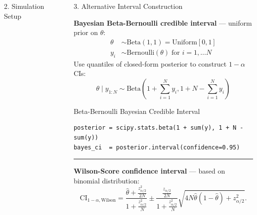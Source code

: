 \documentclass[final]{beamer}
\newlength{\sepwidth}
\newlength{\colwidth}
\newcommand{\separatorcolumn}{\begin{column}{\sepwidth}\end{column}}
\begin{document}
\begin{frame}[fragile]
\begin{columns}[t]
\begin{column}{\colwidth}
\begin{exampleblock}{2. Simulation Setup}



  \end{exampleblock}

\end{column}

\separatorcolumn

\begin{column}{\colwidth}

  \begin{block}{3. Alternative Interval Construction}

    \textbf{Bayesian Beta-Bernoulli credible interval} --- uniform prior on $\theta$:
    $$
    \begin{aligned}
      \theta &\sim \text{Beta}(1, 1) = \text{Uniform}[0, 1] \\
      y_i &\sim \text{Bernoulli}(\theta) \; \text{for } i=1,\dots N 
    \end{aligned}
    $$
    Use quantiles of closed-form posterior to construct $1-\alpha$ CIs:
    $$
    \theta \mid y_{1:N} \sim \text{Beta}\left(1 + \sum_{i=1}^N y_i, 1 + N - \sum_{i=1}^N y_i\right)
    $$

    \begin{pbox}[label={ex:bayes_simple}]{Beta-Bernoulli Bayesian Credible Interval}
    \begin{verbatim}
posterior = scipy.stats.beta(1 + sum(y), 1 + N - sum(y))
bayes_ci  = posterior.interval(confidence=0.95)
    \end{verbatim}
    \end{pbox}

    \vspace{-1.25em}
    \begin{center}
      \rule{0.8\textwidth}{0.4pt}
    \end{center}

    \textbf{Wilson-Score confidence interval} --- based on binomial distribution:
    $$
    \text{CI}_{1-\alpha, \text{Wilson}} = \frac{\hat{\theta} + \frac{z_{\alpha/2}^2}{2N}}{1 + \frac{z_{\alpha/2}^2}{N}} \pm \frac{\frac{z_{\alpha/2}}{2N}}{1 + \frac{z_{\alpha/2}^2}{N}}\sqrt{4N\hat{\theta}(1 - \hat{\theta}) + z_{\alpha/2}^2}.
    $$


\end{block}
\end{column}
\end{columns}
\end{frame}
\end{document}
